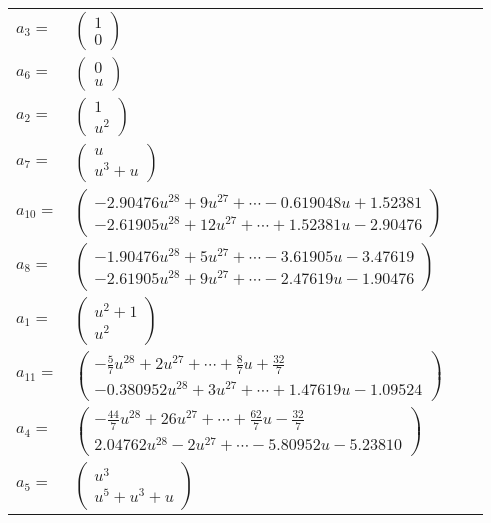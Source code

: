\documentclass[1p]{elsarticle_modified}
\theoremstyle{definition}
\begin{document}
\begin{tabular}{m{7pt} m{180pt} m{7pt} m{180pt} }
\flushright $a_{3}=$&$\begin{pmatrix}1\\0\end{pmatrix}$ \\
\flushright $a_{6}=$&$\begin{pmatrix}0\\u\end{pmatrix}$ \\
\flushright $a_{2}=$&$\begin{pmatrix}1\\u^2\end{pmatrix}$ \\
\flushright $a_{7}=$&$\begin{pmatrix}u\\u^3+u\end{pmatrix}$ \\
\flushright $a_{10}=$&$\begin{pmatrix}-2.90476 u^{28}+9 u^{27}+\cdots-0.619048 u+1.52381\\-2.61905 u^{28}+12 u^{27}+\cdots+1.52381 u-2.90476\end{pmatrix}$ \\
\flushright $a_{8}=$&$\begin{pmatrix}-1.90476 u^{28}+5 u^{27}+\cdots-3.61905 u-3.47619\\-2.61905 u^{28}+9 u^{27}+\cdots-2.47619 u-1.90476\end{pmatrix}$ \\
\flushright $a_{1}=$&$\begin{pmatrix}u^2+1\\u^2\end{pmatrix}$ \\
\flushright $a_{11}=$&$\begin{pmatrix}-\frac{5}{7} u^{28}+2 u^{27}+\cdots+\frac{8}{7} u+\frac{32}{7}\\-0.380952 u^{28}+3 u^{27}+\cdots+1.47619 u-1.09524\end{pmatrix}$ \\
\flushright $a_{4}=$&$\begin{pmatrix}-\frac{44}{7} u^{28}+26 u^{27}+\cdots+\frac{62}{7} u-\frac{32}{7}\\2.04762 u^{28}-2 u^{27}+\cdots-5.80952 u-5.23810\end{pmatrix}$ \\
\flushright $a_{5}=$&$\begin{pmatrix}u^3\\u^5+u^3+u\end{pmatrix}$ \\

\end{tabular}
\end{document}
